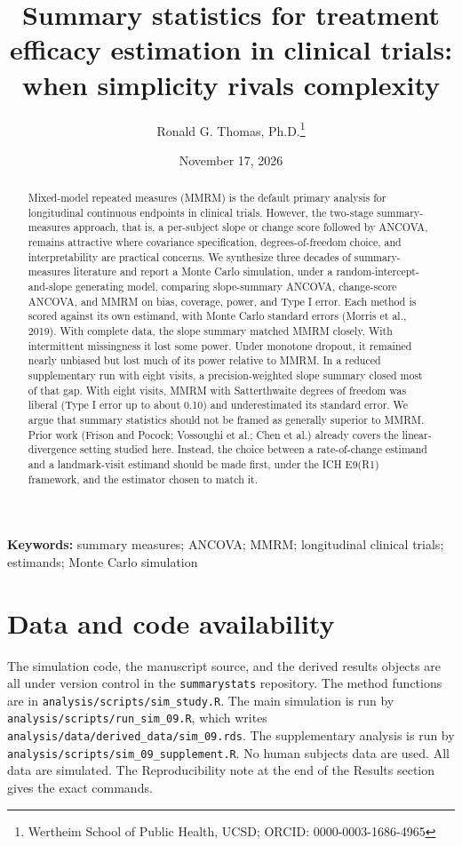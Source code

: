 \documentclass[
  11pt,
]{article}
\title{Summary statistics for treatment efficacy estimation in clinical trials: when simplicity rivals complexity}
\author{Ronald G. Thomas, Ph.D.\thanks{Wertheim School of Public Health, UCSD; ORCID: 0000-0003-1686-4965}}
\date{November 17, 2026}
\begin{document}
\maketitle

{
\setcounter{tocdepth}{2}
\tableofcontents
}
\begin{abstract}
Mixed-model repeated measures (MMRM) is the default primary
analysis for longitudinal continuous endpoints in clinical
trials. However, the two-stage summary-measures approach, that
is, a per-subject slope or change score followed by ANCOVA,
remains attractive where covariance specification,
degrees-of-freedom choice, and interpretability are practical
concerns. We synthesize three decades of summary-measures
literature and report a Monte Carlo simulation, under a
random-intercept-and-slope generating model, comparing
slope-summary ANCOVA, change-score ANCOVA, and MMRM on bias,
coverage, power, and Type I error. Each method is scored
against its own estimand, with Monte Carlo standard errors
(Morris et al., 2019). With complete data, the slope summary
matched MMRM closely. With intermittent missingness it lost some
power. Under monotone dropout, it remained nearly unbiased but
lost much of its power relative to MMRM. In a reduced
supplementary run with eight visits, a precision-weighted slope
summary closed most of that gap. With eight
visits, MMRM with Satterthwaite degrees of freedom was liberal (Type I
error up to about 0.10) and underestimated its standard error. We argue
that summary statistics should not be framed as generally superior to
MMRM. Prior work (Frison and Pocock; Vossoughi et al.; Chen et al.)
already covers the linear-divergence setting studied here. Instead, the
choice between a rate-of-change estimand and a landmark-visit estimand
should be made first, under the ICH E9(R1) framework, and the estimator
chosen to match it.
\end{abstract}

\noindent\textbf{Keywords:} summary measures; ANCOVA; MMRM;
longitudinal clinical trials; estimands; Monte Carlo simulation

\section*{Data and code availability}

The simulation code, the manuscript source, and the derived
results objects are all under version control in the
\texttt{summarystats} repository. The method functions are in
\texttt{analysis/scripts/sim\_study.R}. The main simulation is
run by \texttt{analysis/scripts/run\_sim\_09.R}, which writes
\texttt{analysis/data/derived\_data/sim\_09.rds}. The
supplementary analysis is run by
\texttt{analysis/scripts/sim\_09\_supplement.R}. No human
subjects data are used. All data are simulated. The
Reproducibility note at the end of the Results section gives
the exact commands.
\end{document}
